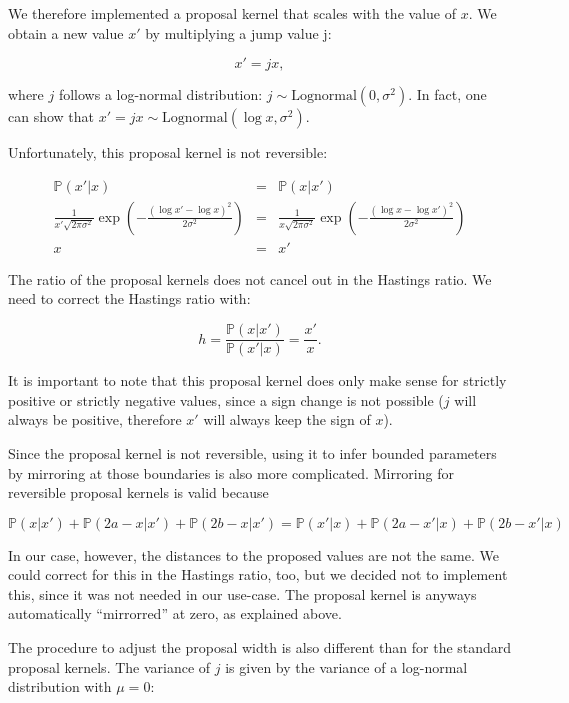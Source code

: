\documentclass[a4paper,11pt]{article}
\def\p{\mathbb{P}}
\begin{document}
We therefore implemented a proposal kernel that scales with the value of $x$. We obtain a new value $x'$ by multiplying a jump value j:

\begin{equation*}
 x' = jx,
\end{equation*}

where $j$ follows a log-normal distribution: $j \sim \mbox{Lognormal}(0, \sigma^2)$. In fact, one can show that $x' = jx \sim \mbox{Lognormal}(\log x, \sigma^2)$.

Unfortunately, this proposal kernel is not reversible:

\begin{eqnarray*}
 \p(x' | x) &=& \p(x | x') \\
 \frac{1}{x' \sqrt{2\pi\sigma^2}} \exp \left(-\frac{(\log x' - \log x)^2}{2\sigma^2} \right) &=& \frac{1}{x \sqrt{2\pi\sigma^2}} \exp \left(-\frac{(\log x - \log x')^2}{2\sigma^2} \right) \\
 x &=& x'
\end{eqnarray*}

The ratio of the proposal kernels does not cancel out in the Hastings ratio. We need to correct the Hastings ratio with:

\begin{equation*}
 h = \frac {\p(x | x')}{\p(x' | x)} = \frac{x'}{x}.
\end{equation*}

It is important to note that this proposal kernel does only make sense for strictly positive or strictly negative values, since a sign change is not possible ($j$ will always be positive, therefore $x'$ will always keep the sign of $x$).

Since the proposal kernel is not reversible, using it to infer bounded parameters by mirroring at those boundaries is also more complicated. Mirroring for reversible proposal kernels is valid because

\begin{equation*}
 \p(x|x') + \p(2a -x | x') + \p(2b - x | x') = \p(x'|x) + \p(2a -x' | x) + \p(2b - x' | x)
\end{equation*}

In our case, however, the distances to the proposed values are not the same. We could correct for this in the Hastings ratio, too, but we decided not to implement this, since it was not needed in our use-case. The proposal kernel is anyways automatically ``mirrorred'' at zero, as explained above.

The procedure to adjust the proposal width is also different than for the standard proposal kernels. The variance of $j$ is given by the variance of a log-normal distribution with $\mu = 0$:
\end{document}

